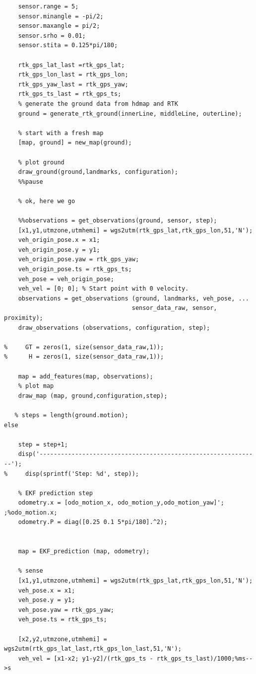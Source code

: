 \documentclass[12pt,a4paper]{article}
\begin{document}
{{{\begin{verbatim}
    sensor.range = 5;
    sensor.minangle = -pi/2;
    sensor.maxangle = pi/2;
    sensor.srho = 0.01;
    sensor.stita = 0.125*pi/180;

    rtk_gps_lat_last =rtk_gps_lat;
    rtk_gps_lon_last = rtk_gps_lon;
    rtk_gps_yaw_last = rtk_gps_yaw;
    rtk_gps_ts_last = rtk_gps_ts;     
    % generate the ground data from hdmap and RTK
    ground = generate_rtk_ground(innerLine, middleLine, outerLine);

    % start with a fresh map
    [map, ground] = new_map(ground);

    % plot ground
    draw_ground(ground,landmarks, configuration);
    %%pause

    % ok, here we go

    %%observations = get_observations(ground, sensor, step);
    [x1,y1,utmzone,utmhemi] = wgs2utm(rtk_gps_lat,rtk_gps_lon,51,'N');
    veh_origin_pose.x = x1;
    veh_origin_pose.y = y1;
    veh_origin_pose.yaw = rtk_gps_yaw;
    veh_origin_pose.ts = rtk_gps_ts;
    veh_pose = veh_origin_pose;
    veh_vel = [0; 0]; % Start point with 0 velocity.
    observations = get_observations (ground, landmarks, veh_pose, ...
                                    sensor_data_raw, sensor, proximity);
    draw_observations (observations, configuration, step);
    
%     GT = zeros(1, size(sensor_data_raw,1));
%      H = zeros(1, size(sensor_data_raw,1));
    
    map = add_features(map, observations);
    % plot map
    draw_map (map, ground,configuration,step);

   % steps = length(ground.motion);
else

    step = step+1;
    disp('--------------------------------------------------------------');
%     disp(sprintf('Step: %d', step));
    
    % EKF prediction step
    odometry.x = [odo_motion_x, odo_motion_y,odo_motion_yaw]'; ;%odo_motion.x;
    odometry.P = diag([0.25 0.1 5*pi/180].^2);

   
    map = EKF_prediction (map, odometry);    

    % sense
    [x1,y1,utmzone,utmhemi] = wgs2utm(rtk_gps_lat,rtk_gps_lon,51,'N');
    veh_pose.x = x1;
    veh_pose.y = y1;
    veh_pose.yaw = rtk_gps_yaw;
    veh_pose.ts = rtk_gps_ts;

    [x2,y2,utmzone,utmhemi] = wgs2utm(rtk_gps_lat_last,rtk_gps_lon_last,51,'N');
    veh_vel = [x1-x2; y1-y2]/(rtk_gps_ts - rtk_gps_ts_last)/1000;%ms-->s


\end{verbatim}}}}
\end{document}
